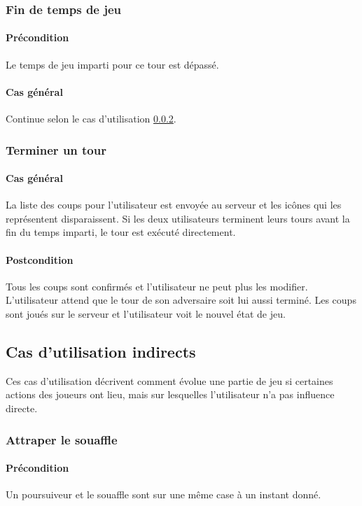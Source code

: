 \subsubsection{Fin de temps de jeu}
    \paragraph{Précondition} Le temps de jeu imparti pour ce tour est dépassé.
    \paragraph{Cas général} Continue selon le cas d'utilisation \ref{UC:endTurn}.

\subsubsection{Terminer un tour}
    \label{UC:endTurn}
    \paragraph{Cas général} La liste des coups pour l'utilisateur est envoyée au serveur et les icônes qui les représentent disparaissent. Si les deux utilisateurs terminent leurs tours avant la fin du temps imparti, le tour est exécuté directement.
    \paragraph{Postcondition} Tous les coups sont confirmés et l'utilisateur ne peut plus les modifier. L'utilisateur attend que le tour de son adversaire soit lui aussi terminé. Les coups sont joués sur le serveur et l'utilisateur voit le nouvel état de jeu.

\subsection{Cas d'utilisation indirects}
Ces cas d'utilisation décrivent comment évolue une partie de jeu si certaines actions des joueurs ont lieu, mais sur lesquelles l'utilisateur n'a pas influence directe.

\subsubsection{Attraper le souaffle}
    \paragraph{Précondition} Un \gls{poursuiveur} et le \gls{souaffle} sont sur une même case à un instant donné.
